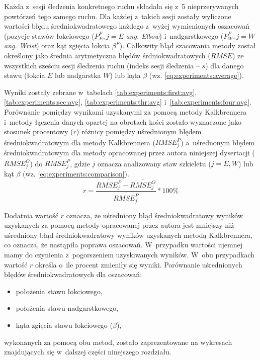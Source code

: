 Każda z~sesji śledzenia konkretnego ruchu składała się z~5 nieprzerywanych powtórzeń tego samego ruchu. Dla każdej z~takich sesji zostały wyliczone wartości błędu średniokwadratowego każdego z~wyżej wymienionych oszacowań (pozycje stawów łokciowego ($P^F_E, j = E$  \emph{ang. Elbow}) i~nadgarstkowego ($P^F_W, j = W$ \emph{ang. Wrist}) oraz kąt zgięcia łokcia $\beta^F$). Całkowity błąd szacowania metody został określony jako średnia arytmetyczna błędów śrdniokwadratowych ($\overline{RMSE}$) ze wszystkich sześciu sesji śledzenia ruchu (indeks sesji śledzenia -- $s$) dla danego stawu (łokcia $E$ lub nadgarstka $W$) lub kąta $\beta$ (wz. \ref{eq:experiments:average}).

Wyniki zostały zebrane w~tabelach \ref{tab:experiments:first:avg}, \ref{tab:experiments:sec:avg}, \ref{tab:experiments:thr:avg} i~\ref{tab:experiments:four:avg}. Porównanie pomiędzy wynikami uzyskanymi za pomocą metody Kalkbrennera i~metody łączenia danych opartej na obrotach kości zostało wyznaczone jako stosunek procentowy ($r$) różnicy pomiędzy uśrednionym błędem średniokwadratowym dla metody Kalkbrennera ($\overline{RMSE^P_j}$) a~uśrednonym błędem średniokwadratowym dla metody opracowanej przez autora niniejszej dysertacji ($\overline{RMSE^O_j}$) do $\overline{RMSE^P_j}$, gdzie $j$ oznacza analizowany staw szkieletu ($j=E, W$) lub kąt $\beta$ (wz. \ref{eq:experiments:comparison}). \\
						
\begin{equation}
	r = \frac{\overline{RMSE^P_j} - \overline{RMSE^O_j}}{\overline{RMSE^P_j}} * 100\%
	\label{eq:experiments:comparison}
\end{equation}
						
Dodatnia wartość $r$ oznacza, że uśredniony błąd średniokwadratowy wyników uzyskanych za pomocą metody opracowanej przez autora jest mniejszy niż uśredniony błąd średniokwadratowy wyników uzyskanych metodą Kalkbrennera, co oznacza, że nastąpiła poprawa oszacowań. W~przypadku wartości ujemnej mamy do czynienia z~pogorszeniem uzyskiwanych wyników. W~obu przypadkach wartość $r$ określa o~ile procent zmieniły się wyniki. Porównanie uśrednionych błędów średniokwadratowych dla oszacowań:
\begin{itemize}
	\item położenia stawu łokciowego,
	\item położenia stawu nadgarstkowego,
	\item kąta zgięcia stawu łokciowego ($\beta$),
\end{itemize}
wykonanych za pomocą obu metod, zostało zaprezentowane na wykresach znajdujących się w~dalszej części ninejszego rozdziału.
						
